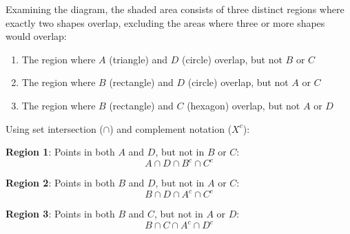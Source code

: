\documentclass[12pt]{article}
\begin{document}
\begin{center}
\end{center}

\vspace{0.3cm}

\begin{stepbox}

Examining the diagram, the shaded area consists of three distinct regions where exactly two shapes overlap, excluding the areas where three or more shapes would overlap:

\begin{enumerate}[leftmargin=2em, itemsep=0pt]
    \item The region where $A$ (triangle) and $D$ (circle) overlap, but not $B$ or $C$
    \item The region where $B$ (rectangle) and $D$ (circle) overlap, but not $A$ or $C$
    \item The region where $B$ (rectangle) and $C$ (hexagon) overlap, but not $A$ or $D$
\end{enumerate}

\end{stepbox}

\begin{stepbox}

Using set intersection ($\cap$) and complement notation ($X^c$):

\vspace{0.2cm}

\textbf{Region 1}: Points in both $A$ and $D$, but not in $B$ or $C$:
\[
A \cap D \cap B^c \cap C^c
\]

\textbf{Region 2}: Points in both $B$ and $D$, but not in $A$ or $C$:
\[
B \cap D \cap A^c \cap C^c
\]

\textbf{Region 3}: Points in both $B$ and $C$, but not in $A$ or $D$:
\[
B \cap C \cap A^c \cap D^c
\]

\end{stepbox}
\end{document}
